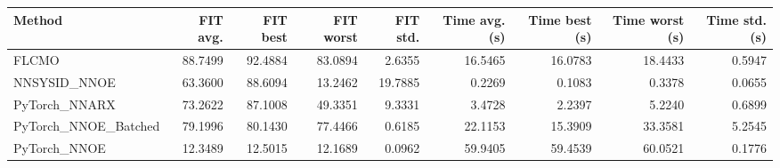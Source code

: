 \begin{tabular}{lrrrrrrrr}
\hline
Method & FIT avg. & FIT best & FIT worst & FIT std. & Time avg. (s) & Time best (s) & Time worst (s) & Time std. (s) \\
\hline
FLCMO & 88.7499 & 92.4884 & 83.0894 & 2.6355 & 16.5465 & 16.0783 & 18.4433 & 0.5947 \\
NNSYSID\_NNOE & 63.3600 & 88.6094 & 13.2462 & 19.7885 & 0.2269 & 0.1083 & 0.3378 & 0.0655 \\
PyTorch\_NNARX & 73.2622 & 87.1008 & 49.3351 & 9.3331 & 3.4728 & 2.2397 & 5.2240 & 0.6899 \\
PyTorch\_NNOE\_Batched & 79.1996 & 80.1430 & 77.4466 & 0.6185 & 22.1153 & 15.3909 & 33.3581 & 5.2545 \\
PyTorch\_NNOE & 12.3489 & 12.5015 & 12.1689 & 0.0962 & 59.9405 & 59.4539 & 60.0521 & 0.1776 \\
\hline
\end{tabular}
